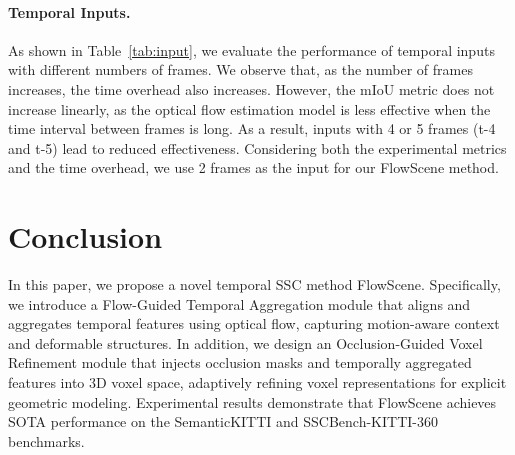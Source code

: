 
\paragraph{Temporal Inputs.}
As shown in Table~\ref{tab:input}, we evaluate the performance of temporal inputs with different numbers of frames. We observe that, as the number of frames increases, the time overhead also increases. However, the mIoU metric does not increase linearly, as the optical flow estimation model is less effective when the time interval between frames is long. As a result, inputs with 4 or 5 frames (t-4 and t-5) lead to reduced effectiveness. Considering both the experimental metrics and the time overhead, we use 2 frames as the input for our FlowScene method.

\section{Conclusion}
In this paper, we propose a novel temporal SSC method FlowScene. Specifically, we introduce a Flow-Guided Temporal Aggregation module that aligns and aggregates temporal features using optical flow, capturing motion-aware context and deformable structures. In addition, we design an Occlusion-Guided Voxel Refinement module that injects occlusion masks and temporally aggregated features into 3D voxel space, adaptively refining voxel representations for explicit geometric modeling.
Experimental results demonstrate that FlowScene achieves SOTA performance on the SemanticKITTI and SSCBench-KITTI-360 benchmarks.